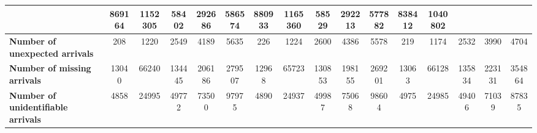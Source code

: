 \begin{table}[!h]
{\begin{tabular}{|l|ccccc|ccccc|ccccc|}
            & \multicolumn{1}{c|}{869164}
            & \multicolumn{1}{c|}{1152305}
            & \multicolumn{1}{c|}{58402}
            & \multicolumn{1}{c|}{292686}
            & \multicolumn{1}{c|}{586574}
            & \multicolumn{1}{c|}{880933}
            & \multicolumn{1}{c|}{1165360}
            & \multicolumn{1}{c|}{58529}
            & \multicolumn{1}{c|}{292213}
            & \multicolumn{1}{c|}{577882}
            & \multicolumn{1}{c|}{838412}
            & \multicolumn{1}{c|}{1040802}
            \\ \hline
            \textbf{Number of unexpected arrivals} & \multicolumn{1}{c|}{208} & \multicolumn{1}{c|}{1220}
            & \multicolumn{1}{c|}{2549}
            & \multicolumn{1}{c|}{4189}
            & \multicolumn{1}{c|}{5635}
            & \multicolumn{1}{c|}{226}
            & \multicolumn{1}{c|}{1224}
            & \multicolumn{1}{c|}{2600}
            & \multicolumn{1}{c|}{4386}
            & \multicolumn{1}{c|}{5578}
            & \multicolumn{1}{c|}{219}
            & \multicolumn{1}{c|}{1174}
            & \multicolumn{1}{c|}{2532}
            & \multicolumn{1}{c|}{3990}
            & \multicolumn{1}{c|}{4704}
            \\ \hline
            \textbf{Number of missing arrivals} & \multicolumn{1}{c|}{13040} & \multicolumn{1}{c|}{66240}
            & \multicolumn{1}{c|}{134445}
            & \multicolumn{1}{c|}{206186}
            & \multicolumn{1}{c|}{279507}
            & \multicolumn{1}{c|}{12968}
            & \multicolumn{1}{c|}{65723}
            & \multicolumn{1}{c|}{130853}
            & \multicolumn{1}{c|}{198155}
            & \multicolumn{1}{c|}{269201}
            & \multicolumn{1}{c|}{13063}
            & \multicolumn{1}{c|}{66128}
            & \multicolumn{1}{c|}{135834}
            & \multicolumn{1}{c|}{223131}
            & \multicolumn{1}{c|}{354864}
            \\ \hline
            \textbf{Number of unidentifiable arrivals} & \multicolumn{1}{c|}{4858} & \multicolumn{1}{c|}{24995}
            & \multicolumn{1}{c|}{49772}
            & \multicolumn{1}{c|}{73500}
            & \multicolumn{1}{c|}{97975}
            & \multicolumn{1}{c|}{4890}
            & \multicolumn{1}{c|}{24937}
            & \multicolumn{1}{c|}{49987}
            & \multicolumn{1}{c|}{75068}
            & \multicolumn{1}{c|}{98604}
            & \multicolumn{1}{c|}{4975}
            & \multicolumn{1}{c|}{24985}
            & \multicolumn{1}{c|}{49406}
            & \multicolumn{1}{c|}{71039}
            & \multicolumn{1}{c|}{87835}

\end{tabular}}
\end{table}
